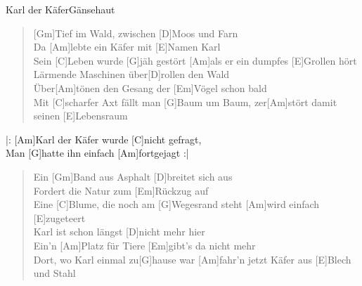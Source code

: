 \begin{song}{Karl der K\"afer}{G\"ansehaut}

    \begin{verse}  
        [Gm]Tief im Wald, zwischen [D]Moos und Farn \\
        Da [Am]lebte ein Käfer mit [E]Namen Karl \\
        Sein [C]Leben wurde [G]jäh gestört [Am]als er ein dumpfes [E]Grollen hört \\
        [Gm]Lärmende Maschinen über[D]rollen den Wald \\
        Über[Am]tönen den Gesang der [Em]Vögel schon bald \\
        Mit [C]scharfer Axt fällt man [G]Baum um Baum, zer[Am]stört damit seinen [E]Lebensraum
    \end{verse}  

    \begin{chorus}
        |: [Am]Karl der Käfer wurde [C]nicht gefragt, \\
        Man [G]hatte ihn einfach [Am]fortgejagt :|
    \end{chorus}

    \begin{verse}  
        Ein [Gm]Band aus Asphalt [D]breitet sich aus \\
        [Am]Fordert die Natur zum [Em]Rückzug auf \\
        Eine [C]Blume, die noch am [G]Wegesrand steht [Am]wird einfach [E]zugeteert \\
        [Gm]Karl ist schon längst [D]nicht mehr hier \\
        Ein'n [Am]Platz für Tiere [Em]gibt's da nicht mehr \\
        [C]Dort, wo Karl einmal zu[G]hause war [Am]fahr'n jetzt Käfer aus [E]Blech und Stahl
    \end{verse}  


\end{song}
